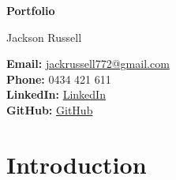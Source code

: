 \documentclass{article}
\begin{document}
\begin{titlepage}
    \centering
    \vspace*{2cm}
    {\Huge\bfseries Portfolio \par}
    \vspace{2cm}
    {\Large Jackson Russell \par}
    \vspace{1cm}

    \textbf{Email:} \href{mailto:jackrussell772@gmail.com}{jackrussell772@gmail.com} \\
    \textbf{Phone:} 0434 421 611 \\
    \textbf{LinkedIn:} \href{https://www.linkedin.com/in/jackson-russell-7aa157205/}{LinkedIn} \\ 
    \textbf{GitHub:} \href{https://github.com/jackfruittt}{GitHub} \\

    \vfill

\end{titlepage}

\tableofcontents
\newpage


\section*{Introduction}



\end{document}
